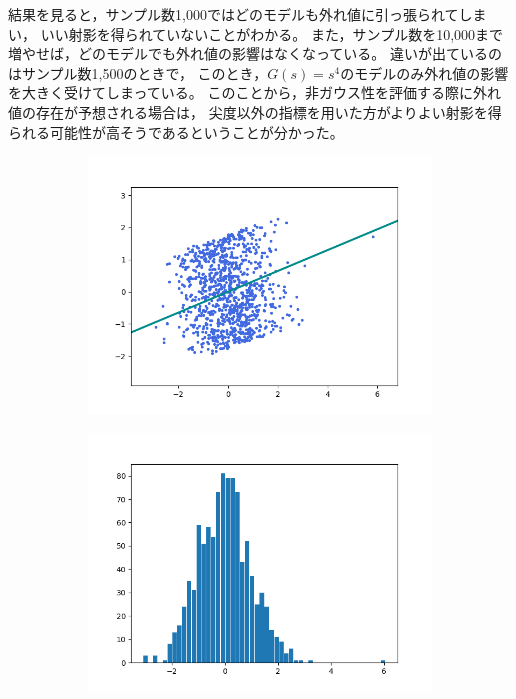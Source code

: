 \documentclass[class=jsarticle, crop=false, dvipdfmx, fleqn]{standalone}
\begin{document}
結果を見ると，サンプル数1,000ではどのモデルも外れ値に引っ張られてしまい，
いい射影を得られていないことがわかる。
また，サンプル数を10,000まで増やせば，どのモデルでも外れ値の影響はなくなっている。
違いが出ているのはサンプル数1,500のときで，
このとき，\(G(s) = s^4\)のモデルのみ外れ値の影響を大きく受けてしまっている。
このことから，非ガウス性を評価する際に外れ値の存在が予想される場合は，
尖度以外の指標を用いた方がよりよい射影を得られる可能性が高そうであるということが分かった。


\clearpage
\begin{figure}
	\centering
    \begin{minipage}{0.45\linewidth}
        \begin{figure}[H]
        	   \centering
            \includegraphics[clip, width=\linewidth]{../figures/assignment2_result_s4_n1000_scatter.png}
            \label{fig:s4_n1000_scatter}
        \end{figure}
    \end{minipage}
    \begin{minipage}{0.45\linewidth}
        \begin{figure}[H]
            \centering
            \includegraphics[clip, width=\linewidth]{../figures/assignment2_result_s4_n1000_hist.png}

\end{figure}
\end{minipage}
\end{figure}
\end{document}
